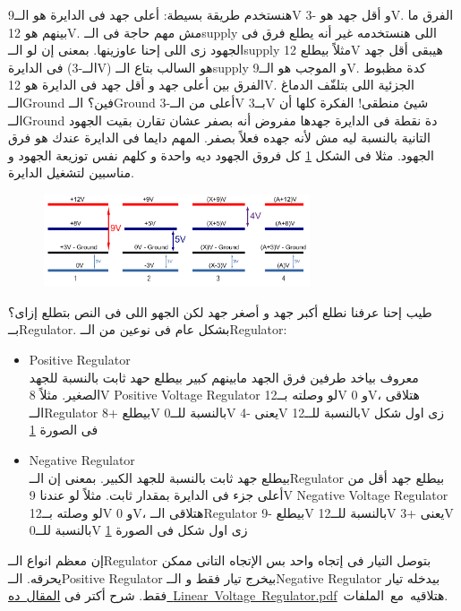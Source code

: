 \documentclass{article}
\begin{document}
هنستخدم طريقة بسيطة: أعلى جهد فى الدايرة هو الــ\textenglish{9V} و أقل جهد هو \textenglish{-3V}. الفرق ما بينهم هو \textenglish{12V}.
مش مهم حاجة فى الــ\textenglish{supply} اللى هنستخدمه غير أنه يطلع فرق فى الجهود زى اللى إحنا عاوزينها.
بمعنى إن لو الــ\textenglish{supply} مثلاً بيطلع \textenglish{12V} هيبقى أقل جهد فى الدايرة
(الــ\textenglish{-3V}) 
هو السالب بتاع الــ\textenglish{supply} و الموجب هو الــ\textenglish{9V}. كدة مظبوط الفرق بين أعلى جهد و أقل جهد فى الدايرة هو \textenglish{12V}.
الجزئية اللى بتلفّف الدماغ الــ\textenglish{Ground} فين؟
الــ\textenglish{Ground} أعلى من الــ\textenglish{-3V} بــ\textenglish{3V} شيئ منطقى! الفكرة كلها أن الــ\textenglish{Ground}
دة نقطة فى الدايرة جهدها مفروض أنه بصفر عشان تقارن بقيت الجهود التانية بالنسبة ليه مش لأنه جهده فعلاً بصفر. المهم دايما فى الدايرة عندك هو فرق الجهود.
مثلا فى الشكل \ref{fig:vref} كل فروق الجهود ديه واحدة و كلهم نفس توزيعة الجهود و مناسبين لتشغيل الدايرة.

\begin{figure}[h]
    \centering
    \includegraphics[width=0.7\textwidth]{vref.pdf}
    \caption{}\label{fig:vref}
\end{figure}

طيب إحنا عرفنا نطلع أكبر جهد و أصغر جهد لكن الجهو اللى فى النص بتطلع إزاى؟ بــ\textenglish{Regulator}. بشكل عام فى نوعين من الــ\textenglish{Regulator}:
\begin{itemize}
    \item \textenglish{Positive Regulator} \\
    معروف بياخد طرفين فرق الجهد مابينهم كبير بيطلع حهد ثابت بالنسبة للجهد الصغير. مثلاً
    \textenglish{8V} \textenglish{Positive Voltage Regulator} لو وصلته بــ\textenglish{12V} و \textenglish{0V}، هتلاقى الــ\textenglish{Regulator}
    بيطلع \textenglish{+8V} بالنسبة للــ\textenglish{0V} يعنى \textenglish{-4V} بالنسبة للــ\textenglish{12V} زى اول شكل فى الصورة \ref{fig:vref}
    \item \textenglish{Negative Regulator} \\
    بيطلع جهد ثابت بالنسبة للجهد الكبير. بمعنى إن الــ\textenglish{Regulator} بيطلع جهد أقل من أعلى جزء فى الدايرة بمقدار ثابت.
    مثلاً لو عندنا \textenglish{9V} \textenglish{Negative Voltage Regulator} لو وصلته بــ\textenglish{12V} و \textenglish{0V}، هتلاقى الــ\textenglish{Regulator}
    بيطلع \textenglish{-9V} بالنسبة للــ\textenglish{12V} يعنى \textenglish{+3V} بالنسبة للــ\textenglish{0V} زى اول شكل فى الصورة \ref{fig:vref}
\end{itemize}
\emph{}
إن معظم انواع الــ\textenglish{Regulator} بتوصل التيار فى إتجاه واحد بس الإتجاه التانى ممكن يحرقه.
الــ\textenglish{Positive Regulator} بيخرج تيار فقط و الــ\textenglish{Negative Regulator} بيدخله تيار فقط.
شرح أكتر فى \mbox{\hyperref{Linear Voltage Regulator.pdf}{}{}{المقال~ده~\textenglish{Linear~Voltage~Regulator.pdf}}~هتلاقيه~مع~الملفات}.
\end{document}
